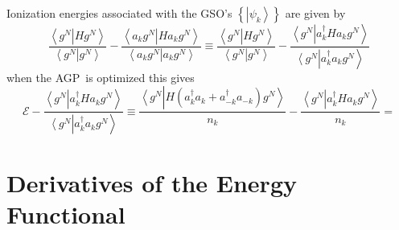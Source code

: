 \documentclass[aps,preprint]{revtex4}%
\begin{document}
Ionization energies associated with the GSO's $\left\{  \left\vert \psi
_{k}\right\rangle \right\}  $ are given by
\begin{equation}
\frac{\left\langle g^{N}\right.  \left\vert Hg^{N}\right\rangle }{\left\langle
g^{N}\right.  \left\vert g^{N}\right\rangle }-\frac{\left\langle a_{k}%
g^{N}\right.  \left\vert Ha_{k}g^{N}\right\rangle }{\left\langle a_{k}%
g^{N}\right.  \left\vert a_{k}g^{N}\right\rangle }\equiv\frac{\left\langle
g^{N}\right.  \left\vert Hg^{N}\right\rangle }{\left\langle g^{N}\right.
\left\vert g^{N}\right\rangle }-\frac{\left\langle g^{N}\right.  \left\vert
a_{k}^{\dagger}Ha_{k}g^{N}\right\rangle }{\left\langle g^{N}\right.
\left\vert a_{k}^{\dagger}a_{k}g^{N}\right\rangle }%
\end{equation}
when the AGP\ is optimized this gives
\begin{equation}
\mathcal{E-}\frac{\left\langle g^{N}\right.  \left\vert a_{k}^{\dagger}%
Ha_{k}g^{N}\right\rangle }{\left\langle g^{N}\right.  \left\vert
a_{k}^{\dagger}a_{k}g^{N}\right\rangle }\equiv\frac{\left\langle g^{N}\right.
\left\vert H\left(  a_{k}^{\dagger}a_{k}+a_{-k}^{\dagger}a_{-k}\right)
g^{N}\right\rangle }{n_{k}}-\frac{\left\langle g^{N}\right.  \left\vert
a_{k}^{\dagger}Ha_{k}g^{N}\right\rangle }{n_{k}}=
\end{equation}


\section{Derivatives of the Energy Functional\label{variational}}
\end{document}
